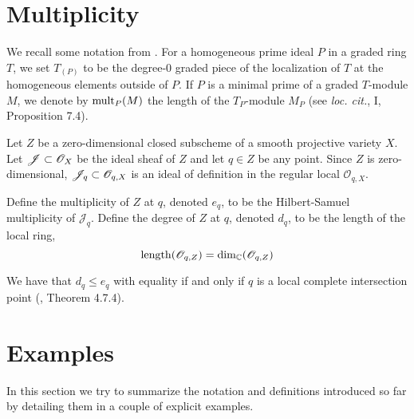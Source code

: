 \documentclass[fleqn,reqno]{amsart}
\numberwithin{first}{chapter}
\begin{document}
\section{Multiplicity}

\begin{paragraf}
\label{par:mult-ha}
We recall some notation from \cite{Har-book-77}. For a homogeneous
prime ideal $P$ in a graded ring $T$, we set $T_{(P)}$ to be the degree-0 graded piece of the localization
of $T$ at the homogeneous elements outside of $P$. If $P$ is a minimal prime of a graded $T$-module
$M$, we denote by $\operatorname{mult}_P(M)$ the length of the $T_P$-module $M_P$ (see {\em loc. cit.}, I, Proposition 7.4).
\end{paragraf}

\begin{paragraf}
\label{par:mult}
Let $Z$ be a zero-dimensional closed subscheme of a smooth projective variety $X$.
Let $\mathscr{J}\subset\mathscr{O}_X$ be the ideal sheaf of $Z$
and let $q\in Z$ be any point.
Since $Z$ is zero-dimensional, $\mathscr{J}_q\subset\mathscr{O}_{q,X}$ is an ideal of definition
in the regular local $\mathscr{O}_{q,X}$.

Define the multiplicity of $Z$ at $q$, denoted $e_q$,
to be the Hilbert-Samuel multiplicity of $\mathscr{J}_q$.
Define the degree of $Z$ at $q$, denoted $d_q$, to be the length of the local ring,
\[	
	\operatorname{length}(\mathscr{O}_{q,Z})=\dim_{\mathbb{C}}(\mathscr{O}_{q,Z})
\]

We have that $d_q\leq e_q$ with equality if and only if $q$ is a local complete intersection
point (\citet{BH-98-CMrings}, Theorem 4.7.4).
\end{paragraf}



\section{Examples}

In this section we try to summarize the notation and definitions introduced so far
by detailing them in a couple of explicit examples.
\end{document}

